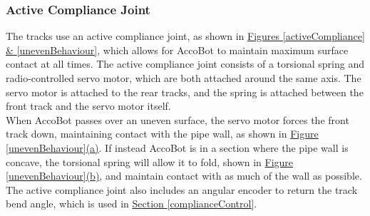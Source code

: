\documentclass[11pt]{article}		%
\newcommand{\sectref}[1]{\hyperref[#1]{Section \ref*{#1}}}     %
\begin{document}
			\subsubsection{Active Compliance Joint} \label{trackDetails}
			
				The tracks use an active compliance joint, as shown in \hyperref[activeCompliance]{Figures \ref*{activeCompliance} \& \ref*{unevenBehaviour}}, which allows for AccoBot to maintain maximum surface contact at all times.
				The active compliance joint consists of a torsional spring and radio-controlled servo motor, which are both attached around the same axis.
				The servo motor is attached to the rear tracks, and the spring is attached between the front track and the servo motor itself.
				\\
                \hspace*{3ex}When AccoBot passes over an uneven surface, the servo motor forces the front track down, maintaining contact with the pipe wall, as shown in \hyperref[unevenBehaviour]{Figure \ref*{unevenBehaviour}(a)}.
				If instead AccoBot is in a section where the pipe wall is concave, the torsional spring will allow it to fold, shown in \hyperref[unevenBehaviour]{Figure \ref*{unevenBehaviour}(b)}, and maintain contact with as much of the wall as possible.
				The active compliance joint also includes an angular encoder to return the track bend angle, which is used in \sectref{complianceControl}.
\end{document}
